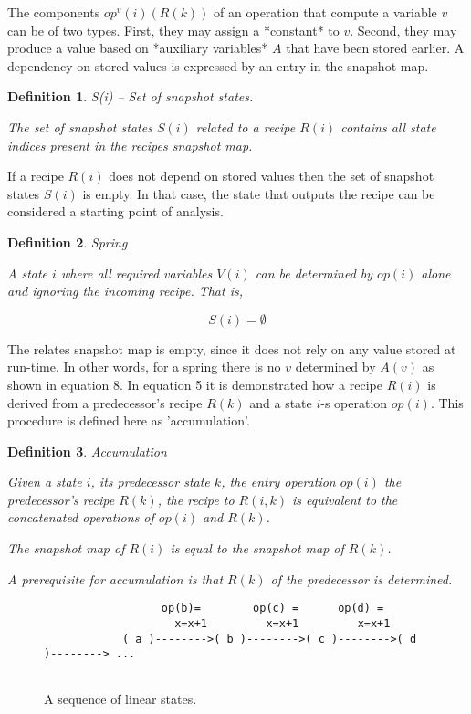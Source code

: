 \documentclass[12pt,a4paper]{scrartcl}
\newtheorem{definition}{Definition}
\begin{document}
The components $op^v(i)(R(k))$ of an operation that compute a variable $v$
can be of two types. First, they may assign a *constant* to $v$. Second, they may
produce a value based on *auxiliary variables* $A$ that have been stored earlier.
A dependency on stored values is expressed by an entry in the snapshot map.

\begin{definition}
S(i) -- Set of snapshot states.

The set of snapshot states $S(i)$ related to a recipe $R(i)$ contains
all state indices present in the recipes snapshot map.
\end{definition}

If a recipe $R(i)$ does not depend on stored values then the set of snapshot
states $S(i)$ is empty. In that case, the state that outputs the recipe can 
be considered a starting point of analysis.

\begin{definition}
Spring

A state $i$ where all required variables $V(i)$ can be determined by 
$op(i)$ alone and ignoring the incoming recipe. That is, 
\end{definition}

\begin{equation}
                          S(i) = \emptyset
\end{equation}

The relates snapshot map is empty, since it does not rely on any value stored
at run-time.  In other words, for a spring there is no $v$ determined by $A(v)$
as shown in equation 8.  In equation 5 it is demonstrated how a recipe $R(i)$
is derived from a predecessor's recipe $R(k)$ and a state $i$-s operation
$op(i)$. This procedure is defined here as 'accumulation'.

\begin{definition}
Accumulation

Given a state $i$, its predecessor state $k$, the entry operation $op(i)$
the predecessor's recipe $R(k)$, the recipe to $R(i,k)$ is equivalent
to the concatenated operations of $op(i)$ and $R(k)$.

The snapshot map of $R(i)$ is equal to the snapshot map of $R(k)$.

A prerequisite for accumulation is that $R(k)$ of the predecessor is 
determined.
\end{definition}

\begin{figure}[htbp] \leavevmode
\begin{verbatim}
                  op(b)=        op(c) =      op(d) =
                    x=x+1         x=x+1         x=x+1        
            ( a )-------->( b )-------->( c )-------->( d )--------> ...


\end{verbatim}
\caption{A sequence of linear states.}
\end{figure}
\end{document}
